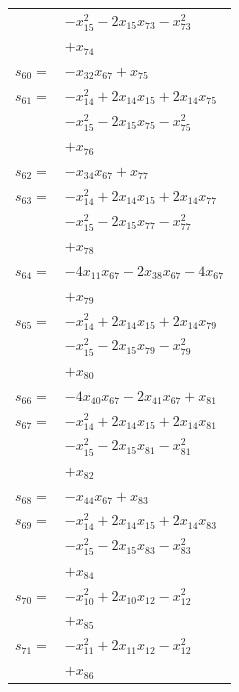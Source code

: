 \begin{longtable}{@{}r@{\;}l@{}}
 & \(\displaystyle -x_{15}^{2} -2x_{15}x_{73} -x_{73}^{2}\) \\
 & \(\displaystyle +x_{74}\) \\[3pt]
\(s_{60}=\) & \(\displaystyle -x_{32}x_{67} +x_{75}\) \\[3pt]
\(s_{61}=\) & \(\displaystyle -x_{14}^{2} +2x_{14}x_{15} +2x_{14}x_{75}\) \\
 & \(\displaystyle -x_{15}^{2} -2x_{15}x_{75} -x_{75}^{2}\) \\
 & \(\displaystyle +x_{76}\) \\[3pt]
\(s_{62}=\) & \(\displaystyle -x_{34}x_{67} +x_{77}\) \\[3pt]
\(s_{63}=\) & \(\displaystyle -x_{14}^{2} +2x_{14}x_{15} +2x_{14}x_{77}\) \\
 & \(\displaystyle -x_{15}^{2} -2x_{15}x_{77} -x_{77}^{2}\) \\
 & \(\displaystyle +x_{78}\) \\[3pt]
\(s_{64}=\) & \(\displaystyle -4x_{11}x_{67} -2x_{38}x_{67} -4x_{67}\) \\
 & \(\displaystyle +x_{79}\) \\[3pt]
\(s_{65}=\) & \(\displaystyle -x_{14}^{2} +2x_{14}x_{15} +2x_{14}x_{79}\) \\
 & \(\displaystyle -x_{15}^{2} -2x_{15}x_{79} -x_{79}^{2}\) \\
 & \(\displaystyle +x_{80}\) \\[3pt]
\(s_{66}=\) & \(\displaystyle -4x_{40}x_{67} -2x_{41}x_{67} +x_{81}\) \\[3pt]
\(s_{67}=\) & \(\displaystyle -x_{14}^{2} +2x_{14}x_{15} +2x_{14}x_{81}\) \\
 & \(\displaystyle -x_{15}^{2} -2x_{15}x_{81} -x_{81}^{2}\) \\
 & \(\displaystyle +x_{82}\) \\[3pt]
\(s_{68}=\) & \(\displaystyle -x_{44}x_{67} +x_{83}\) \\[3pt]
\(s_{69}=\) & \(\displaystyle -x_{14}^{2} +2x_{14}x_{15} +2x_{14}x_{83}\) \\
 & \(\displaystyle -x_{15}^{2} -2x_{15}x_{83} -x_{83}^{2}\) \\
 & \(\displaystyle +x_{84}\) \\[3pt]
\(s_{70}=\) & \(\displaystyle -x_{10}^{2} +2x_{10}x_{12} -x_{12}^{2}\) \\
 & \(\displaystyle +x_{85}\) \\[3pt]
\(s_{71}=\) & \(\displaystyle -x_{11}^{2} +2x_{11}x_{12} -x_{12}^{2}\) \\
 & \(\displaystyle +x_{86}\) \\[3pt]

\end{longtable}

